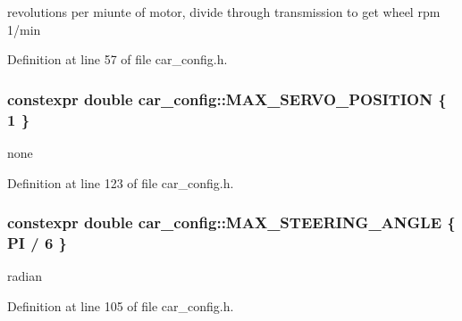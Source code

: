 revolutions per miunte of motor, divide through transmission to get wheel rpm  1/min 



Definition at line 57 of file car\+\_\+config.\+h.

\subsubsection[{\texorpdfstring{M\+A\+X\+\_\+\+S\+E\+R\+V\+O\+\_\+\+P\+O\+S\+I\+T\+I\+ON}{MAX_SERVO_POSITION}}]{\setlength{\rightskip}{0pt plus 5cm}constexpr double car\+\_\+config\+::\+M\+A\+X\+\_\+\+S\+E\+R\+V\+O\+\_\+\+P\+O\+S\+I\+T\+I\+ON \{ 1 \}}\hypertarget{namespacecar__config_af1712762f3ad9f8805ba474d5f3e7274}{}\label{namespacecar__config_af1712762f3ad9f8805ba474d5f3e7274}


none 



Definition at line 123 of file car\+\_\+config.\+h.

\subsubsection[{\texorpdfstring{M\+A\+X\+\_\+\+S\+T\+E\+E\+R\+I\+N\+G\+\_\+\+A\+N\+G\+LE}{MAX_STEERING_ANGLE}}]{\setlength{\rightskip}{0pt plus 5cm}constexpr double car\+\_\+config\+::\+M\+A\+X\+\_\+\+S\+T\+E\+E\+R\+I\+N\+G\+\_\+\+A\+N\+G\+LE \{ {\bf PI} / 6 \}}\hypertarget{namespacecar__config_a967b325af26effe80fbbc64dc68a36a0}{}\label{namespacecar__config_a967b325af26effe80fbbc64dc68a36a0}


radian 



Definition at line 105 of file car\+\_\+config.\+h.

